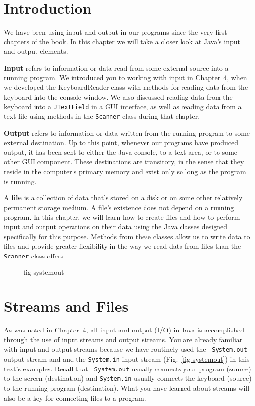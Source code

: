 \section{Introduction}
\label{introduction}
\noindent We have been using input and output in our programs 
since the very first chapters of the book. In this chapter we
will take a closer look at Java's input and output elements.

{\bf Input} refers to information or data read from some external
source into a running program. We introduced you to working with input
in Chapter~4, when we developed the KeyboardReader class with methods
for reading data from the keyboard into the console window. We also
discussed reading data from the keyboard into a {\tt JTextField} in a
GUI interface, as well as  reading data
from a text file using methods in the {\tt Scanner} class during that
chapter.

{\bf Output} refers to information or data written from the running
program to some external destination.  Up to this point, whenever our
programs have produced output, it has been sent to either the Java
console, to a text area, or to some other GUI component.  These
destinations are transitory, in the sense that they reside in the
computer's primary memory and exist only so long as the program is
running.

A {\bf file} is a collection of data that's stored on a disk or on
some other relatively permanent storage medium.  A file's existence
does not depend on a running program.  In this chapter, we will learn
how to create files and how to perform input and output operations on
their data using the Java classes designed specifically for this
purpose.  Methods from these classes allow us to write data to files
and provide greater flexibility in the way we read data from files 
than the {\tt Scanner} class offers.

\begin{figure}[b]
 {fig-systemout}

\end{figure}

\section{Streams and Files}
\label{streamsand-files}
\noindent As was noted in Chapter~4, all input and output (I/O) in
Java is accomplished through the use of input streams and output
streams.  You are already familiar with input and output streams
because we  have routinely used the {\tt
System.out} output stream and and the {\tt System.in} input stream
(Fig.~\ref{fig-systemout}) in this text's examples. Recall that {\tt
System.out} usually connects your program (source) to the screen
(destination) and {\tt System.in} usually connects the keyboard
(source) to the running program (destination). What you have learned
about streams will also be a key for connecting files to a program.


